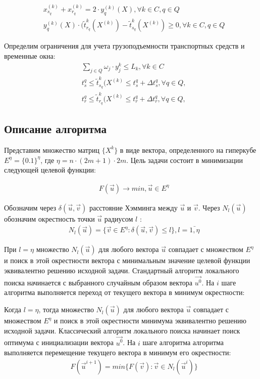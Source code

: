 \documentclass[]{TAACpaper}
\begin{document}
\begin{align} 
& x^{(k)}_{s_q} + x^{(k)}_{r_q} = 2 \cdot y^{(k)}_{q}(X), \forall k \in C, q \in Q  \\
& y^{(k)}_{q}(X) \cdot (\tilde{t}^k_{r_q}(X^{(k)})-\tilde{t}^k_{s_q}(X^{(k)})\ge{0}, \forall k \in C, q \in Q
\end{align}

Определим ограничения для учета грузоподъемности транспортных средств и временные окна:
\begin{align} 
& \sum_{j\in{Q}} \omega_j \cdot y_{j}^{k} \leq L_k, \forall{k}\in{C}\\
& t_{s}^{q} \leq \tilde{t}^k_{s_q}(X^{(k)} \leq t_{s}^{q}+ \Delta{t_{s}^{q}}, \forall q \in Q, \label{tws_cond} \\
& t_{r}^{q} \leq \tilde{t}^k_{r_q}(X^{(k)} \leq t_{r}^{q}+ \Delta{t_{r}^{q}}, \forall q \in Q, \label{twr_cond}
\end{align}



\subsection{Описание алгоритма}
Представим множество матриц $\{X^k\}$ в виде вектора, определенного на гиперкубе $E^\eta=\{0.1\}^\eta$, где $\eta=n\cdot(2m+1)\cdot 2m$. Цель задачи состоит в минимизации следующей целевой функции:
		
\begin{align} 
& F(\vec{u})\to min,\vec{u}\in E^{\eta}
\end{align}	

Обозначим через $\delta(\vec{u},\vec{v})$ расстояние Хэмминга между $\vec{u}$ и $\vec{v}$. Через $N_l(\vec{u})$ обозначим окрестность точки $\vec{u}$ радиусом $l$ \cite{vrp_shafeyev}:
\begin{align} 
& N_l(\vec{u})=\{\vec{v} \in E^{\eta}:\delta(\vec{u},\vec{v})\le l \}, l=\bar{1,\eta}
\end{align}	


При $l=\eta$ множество $N_l(\vec{u})$ для любого вектора $ \vec{u} $ совпадает с множеством $E^{\eta}$ и поиск в этой окрестности вектора с минимальным значение целевой функции эквивалентно решению исходной задачи. Стандартный алгоритм локального поиска начинается с выбранного случайным образом вектора $\vec{u^0}$. На $i$ шаге алгоритма выполняется переход от текущего вектора в минимум окрестности:

Когда $l=\eta$, тогда множество $ N_l(\vec{u})$ для любого вектора $\vec{u}$ совпадает с множеством $E^{\eta}$  и поиск в этой окрестности минимума эквивалентно решению исходной задачи. Классический алгоритм локального поиска начинает поиск оптимума с  инициализации вектора $\vec{u^0}$.
На $i$ шаге алгоритма  алгоритма выполняется перемещение текущего вектора в минимум его окрестности:
\begin{align} 
& F(\vec{u}^{i+1})=min\{F(\vec{v}):\vec{v} \in N_l(\vec{u}^i)\}
\end{align}	
\end{document}
